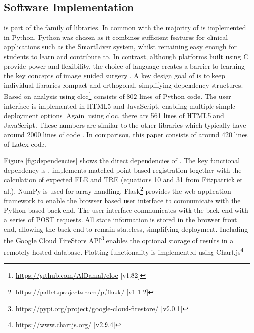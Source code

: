 \subsection{Software Implementation}
\fred is part of the \sksurgery\cite{PMID:32436132} family of libraries. In common with \sksurgery the majority of \fred is implemented in Python. Python was chosen as it combines sufficient features for clinical
applications such as the SmartLiver system\cite{PMID:32780240}, whilst remaining easy enough for students to learn and contribute to. 
In contrast, although platforms built using {C\raisebox{0.5ex}{\tiny\textbf{++}}} provide power and 
flexibility, the choice of language creates a barrier to learning the key concepts of image guided surgery \cite{surgineering}. A key design goal of 
\sksurgery is to keep individual libraries compact and orthogonal\cite{pragmaticprog}, simplifying dependency structures. Based on 
analysis using cloc\footnote{\href{https://github.com/AlDanial/cloc}{https://github.com/AlDanial/cloc} [v1.82]} \fred consists of 802 lines of Python 
code. The user interface is implemented in HTML5 and JavaScript, enabling multiple simple deployment 
options. Again, using cloc, there are 561 lines of HTML5 and JavaScript. These numbers are similar to the other \sksurgery libraries which typically have around 2000 lines of code \cite{PMID:32436132}. In comparison, this paper consists of around 420 lines of Latex code.

Figure \ref{fig:dependencies} shows the direct dependencies of \fredns. The key functional dependency is
\core\cite{matt_clarkson_2020_3965731}. \core implements matched point based registration \cite{Arun1987} together 
with the calculation of expected \gls{FLE} and \gls{TRE}
(equations 10 and 31 from Fitzpatrick et al.\cite{Fitzpatrick1998}). 
{NumPy} \cite{2020NumPy-Array} is used for array handling.
Flask\footnote{\href{https://palletsprojects.com/p/flask/}{https://palletsprojects.com/p/flask/}  [v1.1.2]} provides the web application framework 
to enable the browser based user interface to communicate with the Python based back end. The user
interface communicates with the back end with a series of {POST} requests. All state information is stored in the 
browser front end, allowing the back end to remain stateless, simplifying deployment. 
Including the Google Cloud FireStore API\footnote{\href{https://pypi.org/project/google-cloud-firestore/}{https://pypi.org/project/google-cloud-firestore/} [v2.0.1]} 
enables the optional storage of results in a remotely hosted database. Plotting functionality is implemented
using Chart.js\footnote{\href{https://www.chartjs.org/}{https://www.chartjs.org/} [v2.9.4]}

